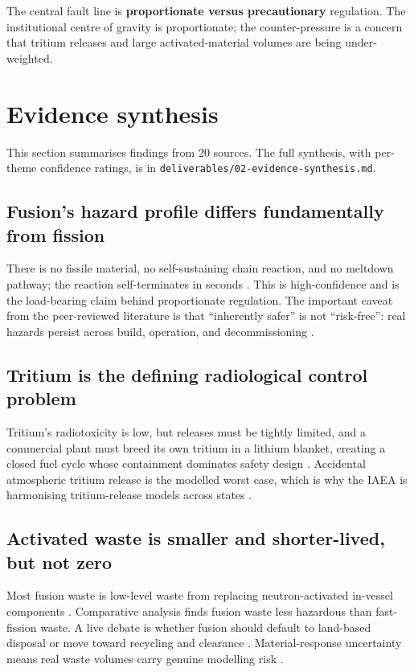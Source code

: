\documentclass[11pt,a4paper]{article}
\begin{document}
The central fault line is \textbf{proportionate versus precautionary} regulation.
The institutional centre of gravity is proportionate; the counter-pressure is a
concern that tritium releases and large activated-material volumes are being
under-weighted.

\section{Evidence synthesis}

This section summarises findings from 20 sources. The full synthesis, with
per-theme confidence ratings, is in \texttt{deliverables/02-evidence-synthesis.md}.

\subsection{Fusion's hazard profile differs fundamentally from fission}
There is no fissile material, no self-sustaining chain reaction, and no meltdown
pathway; the reaction self-terminates in seconds
\citep{iterstafetybasis,ukfusionregfactsheet}. This is high-confidence and is the
load-bearing claim behind proportionate regulation. The important caveat from the
peer-reviewed literature is that ``inherently safer'' is not ``risk-free'': real
hazards persist across build, operation, and decommissioning \citep{proportionate2024}.

\subsection{Tritium is the defining radiological control problem}
Tritium's radiotoxicity is low, but releases must be tightly limited, and a
commercial plant must breed its own tritium in a lithium blanket, creating a
closed fuel cycle whose containment dominates safety design
\citep{tritiumbreeding2018,iaeatecdoc2049}. Accidental atmospheric tritium
release is the modelled worst case, which is why the IAEA is harmonising
tritium-release models across states \citep{iaeatritiumharmonization}.

\subsection{Activated waste is smaller and shorter-lived, but not zero}
Most fusion waste is low-level waste from replacing neutron-activated in-vessel
components \citep{radwasterecycling2023}. Comparative analysis finds fusion waste
less hazardous than fast-fission waste. A live debate is whether fusion should
default to land-based disposal or move toward recycling and clearance
\citep{radwasterecycling2023}. Material-response uncertainty means real waste
volumes carry genuine modelling risk \citep{tritiumbreeding2018}.
\end{document}

